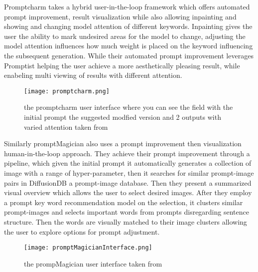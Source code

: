 \documentclass[
  a4paper,  %
  twoside,  %
  bibliography=totoc,
  headsepline,
  cleardoublepage=empty,
  parskip=half,
  draft=false
]{scrbook}
\begin{document}
 
 
 
 
 Promptcharm \cite{promptCharm} takes a hybrid user-in-the-loop framework which offers automated prompt improvement, result visualization while also allowing inpainting and showing and changing model attention of different keywords. Inpainting gives the user the ability to mark undesired areas for the model to change, adjusting the model attention influences how much weight is placed on the keyword influencing the subsequent generation. While their automated prompt improvement leverages Promptist \cite{hao2023optimizingpromptstexttoimagegeneration} helping the user achieve a more aesthetically pleasing result, while enabeling multi viewing of results with different attention.  
 
 \begin{figure}[H]
 	\centering
 	\texttt{[image: promptcharm.png]}
 	\caption{the promptcharm user interface where you can see the field with the initial prompt the suggested modfied version and 2 outputs with varied attention taken from \cite{promptCharm}}
 	\label{fig:promptCharm}
 \end{figure}
 
 
 Similarly promptMagician \cite{PromptMagician} also uses a prompt improvement then visualization human-in-the-loop approach. They achieve their prompt improvement through a pipeline, which 
 given the initial prompt it automatically generates a collection of image with a range of hyper-parameter, then it searches for similar prompt-image pairs in DiffusionDB \cite{diffusiondb} a prompt-image database. Then they present a summarized visual overview which allows the user to select desired images. After they employ a prompt key word recommendation model on the selection, it clusters similar prompt-images and selects important words from prompts disregarding sentence structure. Then the words are visually matched to their image clusters allowing the user to explore options for prompt adjustment.
 
   
  \begin{figure}[H]
 	\centering
 	\texttt{[image: promptMagicianInterface.png]}
 	\caption{the prompMagician user interface  taken from \cite{PromptMagician}}
 	\label{fig:promptMagician}
 \end{figure}
 
 
 
 
 
 
  
\end{document}
